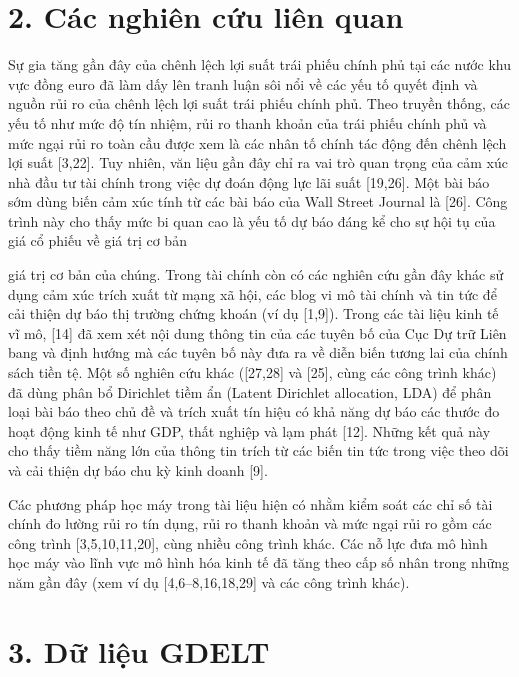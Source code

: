 \section{2. Các nghiên cứu liên quan}

Sự gia tăng gần đây của chênh lệch lợi suất trái phiếu chính phủ tại các nước khu vực đồng euro đã làm dấy lên tranh luận sôi nổi về các yếu tố quyết định và nguồn rủi ro của chênh lệch lợi suất trái phiếu chính phủ. Theo truyền thống, các yếu tố như mức độ tín nhiệm, rủi ro thanh khoản của trái phiếu chính phủ và mức ngại rủi ro toàn cầu được xem là các nhân tố chính tác động đến chênh lệch lợi suất {[}3,22{]}. Tuy nhiên, văn liệu gần đây chỉ ra vai trò quan trọng của cảm xúc nhà đầu tư tài chính trong việc dự đoán động lực lãi suất {[}19,26{]}. Một bài báo sớm dùng biến cảm xúc tính từ các bài báo của Wall Street Journal là {[}26{]}. Công trình này cho thấy mức bi quan cao là yếu tố dự báo đáng kể cho sự hội tụ của giá cổ phiếu về giá trị cơ bản

giá trị cơ bản của chúng. Trong tài chính còn có các nghiên cứu gần đây khác sử dụng cảm xúc trích xuất từ mạng xã hội, các blog vi mô tài chính và tin tức để cải thiện dự báo thị trường chứng khoán (ví dụ {[}1,9{]}). Trong các tài liệu kinh tế vĩ mô, {[}14{]} đã xem xét nội dung thông tin của các tuyên bố của Cục Dự trữ Liên bang và định hướng mà các tuyên bố này đưa ra về diễn biến tương lai của chính sách tiền tệ. Một số nghiên cứu khác ({[}27,28{]} và {[}25{]}, cùng các công trình khác) đã dùng phân bổ Dirichlet tiềm ẩn (Latent Dirichlet allocation, LDA) để phân loại bài báo theo chủ đề và trích xuất tín hiệu có khả năng dự báo các thước đo hoạt động kinh tế như GDP, thất nghiệp và lạm phát {[}12{]}. Những kết quả này cho thấy tiềm năng lớn của thông tin trích từ các biến tin tức trong việc theo dõi và cải thiện dự báo chu kỳ kinh doanh {[}9{]}.

Các phương pháp học máy trong tài liệu hiện có nhằm kiểm soát các chỉ số tài chính đo lường rủi ro tín dụng, rủi ro thanh khoản và mức ngại rủi ro gồm các công trình {[}3,5,10,11,20{]}, cùng nhiều công trình khác. Các nỗ lực đưa mô hình học máy vào lĩnh vực mô hình hóa kinh tế đã tăng theo cấp số nhân trong những năm gần đây (xem ví dụ {[}4,6--8,16,18,29{]} và các công trình khác).

\section{3. Dữ liệu GDELT}

